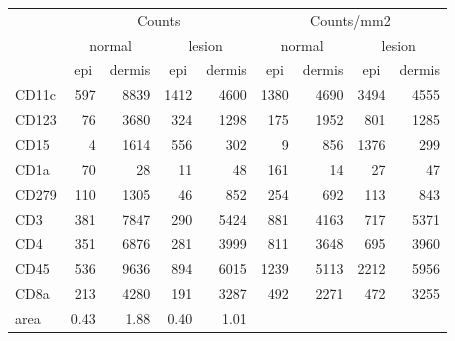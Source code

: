 \begin{tabular}{lrrrr|rrrr}
   \hline
 
         \multicolumn{1}{c}{} & \multicolumn{4}{c|}{Counts} & \multicolumn{4}{c}{Counts/mm2} \\ 
         \multicolumn{1}{c}{} & \multicolumn{2}{c}{normal} & \multicolumn{2}{c|}{lesion} & \multicolumn{2}{c}{normal} & \multicolumn{2}{c}{lesion}  \\ 
         \multicolumn{1}{c}{} & \multicolumn{1}{c}{epi} & dermis & \multicolumn{1}{c}{epi} & \multicolumn{1}{c|}{dermis} & \multicolumn{1}{c}{epi} & dermis & \multicolumn{1}{c}{epi} & dermis  \\ 
         \hline
    CD11c & 597 & 8839 & 1412 & 4600 & 1380 & 4690 & 3494 & 4555 \\ 
  CD123 & 76 & 3680 & 324 & 1298 & 175 & 1952 & 801 & 1285 \\ 
  CD15 & 4 & 1614 & 556 & 302 & 9 & 856 & 1376 & 299 \\ 
  CD1a & 70 & 28 & 11 & 48 & 161 & 14 & 27 & 47 \\ 
  CD279 & 110 & 1305 & 46 & 852 & 254 & 692 & 113 & 843 \\ 
  CD3 & 381 & 7847 & 290 & 5424 & 881 & 4163 & 717 & 5371 \\ 
  CD4 & 351 & 6876 & 281 & 3999 & 811 & 3648 & 695 & 3960 \\ 
  CD45 & 536 & 9636 & 894 & 6015 & 1239 & 5113 & 2212 & 5956 \\ 
  CD8a & 213 & 4280 & 191 & 3287 & 492 & 2271 & 472 & 3255 \\ 
  area & 0.43 & 1.88 & 0.40 & 1.01 &    &    &    &    \\ 
   \hline
\end{tabular}
